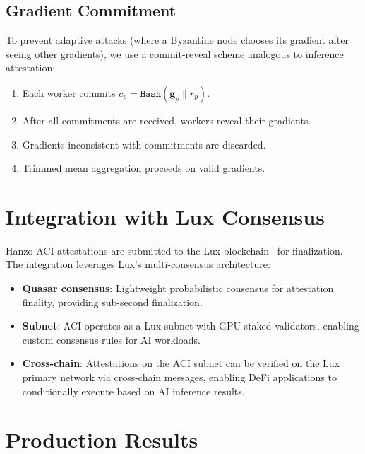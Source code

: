 \documentclass[11pt]{article}
\begin{document}
\subsection{Gradient Commitment}

To prevent adaptive attacks (where a Byzantine node chooses its gradient after
seeing other gradients), we use a commit-reveal scheme analogous to inference
attestation:
\begin{enumerate}[leftmargin=1.4em]
    \item Each worker commits $c_p = \texttt{Hash}(\mathbf{g}_p \| r_p)$.
    \item After all commitments are received, workers reveal their gradients.
    \item Gradients inconsistent with commitments are discarded.
    \item Trimmed mean aggregation proceeds on valid gradients.
\end{enumerate}

\section{Integration with Lux Consensus}
\label{sec:lux}

Hanzo ACI attestations are submitted to the Lux blockchain~\cite{luxwhitepaper}
for finalization. The integration leverages Lux's multi-consensus architecture:

\begin{itemize}[leftmargin=1.1em]
    \item \textbf{Quasar consensus}: Lightweight probabilistic consensus for
    attestation finality, providing sub-second finalization.
    \item \textbf{Subnet}: ACI operates as a Lux subnet with GPU-staked
    validators, enabling custom consensus rules for AI workloads.
    \item \textbf{Cross-chain}: Attestations on the ACI subnet can be verified
    on the Lux primary network via cross-chain messages, enabling DeFi
    applications to conditionally execute based on AI inference results.
\end{itemize}

\section{Production Results}
\label{sec:results}
\end{document}
